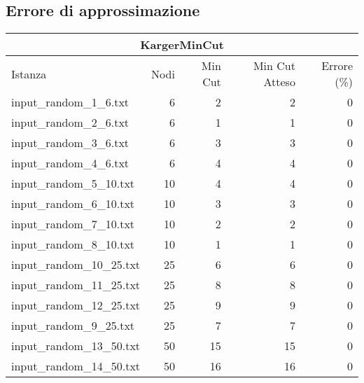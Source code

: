 \subsection{Errore di approssimazione}
\label{sec:approx-error-tables}

\begin{table}[H]
    \centering

    \begin{tabular}{lrrrr}
     \hline
     \multicolumn{5}{c}{KargerMinCut} \\
     \hline
     Istanza                    &    Nodi &   Min Cut &     Min Cut Atteso &     Errore (\%) \\
     \hline
     input\_random\_1\_6.txt    &       6 &         2 &                  2 &               0 \\
     input\_random\_2\_6.txt    &       6 &         1 &                  1 &               0 \\
     input\_random\_3\_6.txt    &       6 &         3 &                  3 &               0 \\
     input\_random\_4\_6.txt    &       6 &         4 &                  4 &               0 \\
     input\_random\_5\_10.txt   &      10 &         4 &                  4 &               0 \\
     input\_random\_6\_10.txt   &      10 &         3 &                  3 &               0 \\
     input\_random\_7\_10.txt   &      10 &         2 &                  2 &               0 \\
     input\_random\_8\_10.txt   &      10 &         1 &                  1 &               0 \\
     input\_random\_10\_25.txt  &      25 &         6 &                  6 &               0 \\
     input\_random\_11\_25.txt  &      25 &         8 &                  8 &               0 \\
     input\_random\_12\_25.txt  &      25 &         9 &                  9 &               0 \\
     input\_random\_9\_25.txt   &      25 &         7 &                  7 &               0 \\
     input\_random\_13\_50.txt  &      50 &        15 &                 15 &               0 \\
     input\_random\_14\_50.txt  &      50 &        16 &                 16 &               0 \\

\end{tabular}
\end{table}
